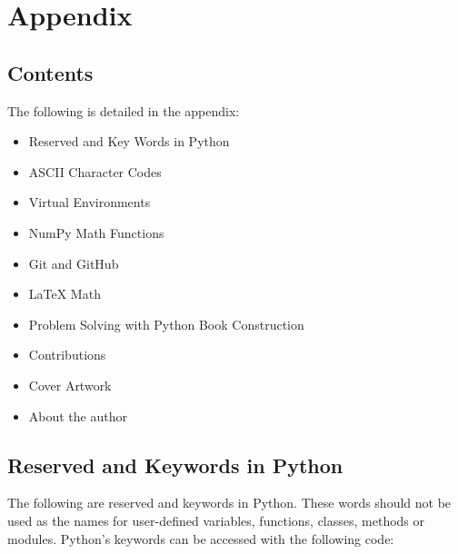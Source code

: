 \documentclass{book}
\begin{document}
    




    
        \hypertarget{appendix}{%
\chapter{Appendix}\label{appendix}}
    




    
        \hypertarget{contents}{%
\section{Contents}\label{contents}}
    




    
        The following is detailed in the appendix:

\begin{itemize}
\item
  Reserved and Key Words in Python
\item
  ASCII Character Codes
\item
  Virtual Environments
\item
  NumPy Math Functions
\item
  Git and GitHub
\item
  LaTeX Math
\item
  Problem Solving with Python Book Construction
\item
  Contributions
\item
  Cover Artwork
\item
  About the author
\end{itemize}
        \newpage

    




    
        \hypertarget{reserved-and-keywords-in-python}{%
\section{Reserved and Keywords in
Python}\label{reserved-and-keywords-in-python}}
    




    
        The following are reserved and keywords in Python. These words should
not be used as the names for user-defined variables, functions, classes,
methods or modules. Python's keywords can be accessed with the following
code:
    
\end{document}
